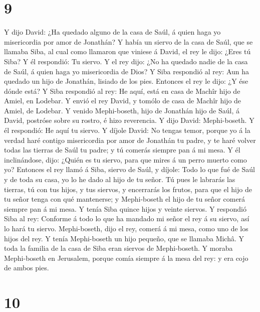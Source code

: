 \hypertarget{section-8}{%
\section{9}\label{section-8}}

 Y dijo David: ¿Ha quedado alguno de la casa de Saúl, á
quien haga yo misericordia por amor de Jonathán?  Y había
un siervo de la casa de Saúl, que se llamaba Siba, al cual como llamaron
que viniese á David, el rey le dijo: ¿Eres tú Siba? Y él respondió: Tu
siervo.  Y el rey dijo: ¿No ha quedado nadie de la casa de
Saúl, á quien haga yo misericordia de Dios? Y Siba respondió al rey: Aun
ha quedado un hijo de Jonathán, lisiado de los pies. 
Entonces el rey le dijo: ¿Y ése dónde está? Y Siba respondió al rey: He
aquí, está en casa de Machîr hijo de Amiel, en Lodebar.  Y
envió el rey David, y tomólo de casa de Machîr hijo de Amiel, de
Lodebar.  Y venido Mephi-boseth, hijo de Jonathán hijo de
Saúl, á David, postróse sobre su rostro, é hizo reverencia. Y dijo
David: Mephi-boseth. Y él respondió: He aquí tu siervo.  Y
díjole David: No tengas temor, porque yo á la verdad haré contigo
misericordia por amor de Jonathán tu padre, y te haré volver todas las
tierras de Saúl tu padre; y tú comerás siempre pan á mi mesa.
 Y él inclinándose, dijo: ¿Quién es tu siervo, para que
mires á un perro muerto como yo?  Entonces el rey llamó á
Siba, siervo de Saúl, y díjole: Todo lo que fué de Saúl y de toda su
casa, yo lo he dado al hijo de tu señor.  Tú pues le
labrarás las tierras, tú con tus hijos, y tus siervos, y encerrarás los
frutos, para que el hijo de tu señor tenga con qué mantenerse; y
Mephi-boseth el hijo de tu señor comerá siempre pan á mi mesa. Y tenía
Siba quince hijos y veinte siervos.  Y respondió Siba al
rey: Conforme á todo lo que ha mandado mi señor el rey á su siervo, así
lo hará tu siervo. Mephi-boseth, dijo el rey, comerá á mi mesa, como uno
de los hijos del rey.  Y tenía Mephi-boseth un hijo
pequeño, que se llamaba Michâ. Y toda la familia de la casa de Siba eran
siervos de Mephi-boseth.  Y moraba Mephi-boseth en
Jerusalem, porque comía siempre á la mesa del rey: y era cojo de ambos
pies.

\hypertarget{section-9}{%
\section{10}\label{section-9}}

